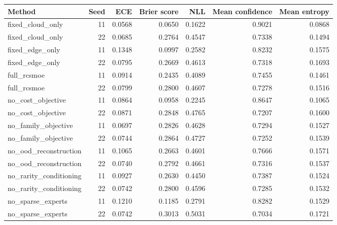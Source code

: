 \begin{tabular}{lrrrrrr}
\toprule
Method & Seed & ECE & Brier score & NLL & Mean confidence & Mean entropy \\
\midrule
fixed\_cloud\_only & 11 & 0.0568 & 0.0650 & 0.1622 & 0.9021 & 0.0868 \\
fixed\_cloud\_only & 22 & 0.0685 & 0.2764 & 0.4547 & 0.7338 & 0.1494 \\
fixed\_edge\_only & 11 & 0.1348 & 0.0997 & 0.2582 & 0.8232 & 0.1575 \\
fixed\_edge\_only & 22 & 0.0795 & 0.2669 & 0.4613 & 0.7318 & 0.1693 \\
full\_rcsmoe & 11 & 0.0914 & 0.2435 & 0.4089 & 0.7455 & 0.1461 \\
full\_rcsmoe & 22 & 0.0799 & 0.2800 & 0.4607 & 0.7278 & 0.1516 \\
no\_cost\_objective & 11 & 0.0864 & 0.0958 & 0.2245 & 0.8647 & 0.1065 \\
no\_cost\_objective & 22 & 0.0871 & 0.2848 & 0.4765 & 0.7207 & 0.1600 \\
no\_family\_objective & 11 & 0.0697 & 0.2826 & 0.4628 & 0.7294 & 0.1527 \\
no\_family\_objective & 22 & 0.0744 & 0.2864 & 0.4727 & 0.7252 & 0.1539 \\
no\_ood\_reconstruction & 11 & 0.1065 & 0.2663 & 0.4601 & 0.7666 & 0.1571 \\
no\_ood\_reconstruction & 22 & 0.0740 & 0.2792 & 0.4661 & 0.7316 & 0.1537 \\
no\_rarity\_conditioning & 11 & 0.0927 & 0.2630 & 0.4450 & 0.7387 & 0.1524 \\
no\_rarity\_conditioning & 22 & 0.0742 & 0.2800 & 0.4596 & 0.7285 & 0.1532 \\
no\_sparse\_experts & 11 & 0.1210 & 0.1185 & 0.2791 & 0.8282 & 0.1529 \\
no\_sparse\_experts & 22 & 0.0742 & 0.3013 & 0.5031 & 0.7034 & 0.1721 \\
\bottomrule
\end{tabular}
